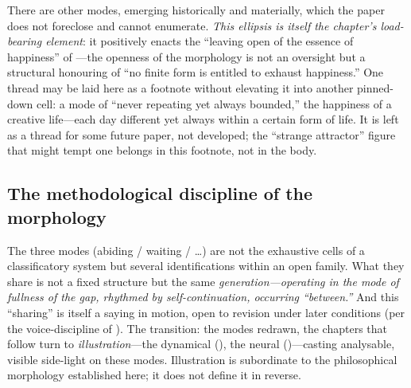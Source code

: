 There are other modes, emerging historically and materially, which the paper does not foreclose and cannot enumerate. \emph{This ellipsis is itself the chapter's load-bearing element}: it positively enacts the ``leaving open of the essence of happiness'' of ---the openness of the morphology is not an oversight but a structural honouring of ``no finite form is entitled to exhaust happiness.'' One thread may be laid here as a footnote without elevating it into another pinned-down cell: a mode of ``never repeating yet always bounded,'' the happiness of a creative life---each day different yet always within a certain form of life. It is left as a thread for some future paper, not developed; the ``strange attractor'' figure that might tempt one belongs in this footnote, not in the body.

\subsection{The methodological discipline of the morphology}
\label{p19:sub:modes-discipline}

The three modes (abiding / waiting / \ldots) are not the exhaustive cells of a classificatory system but several identifications within an open family. What they share is not a fixed structure but the same \emph{generation---operating in the mode of fullness of the gap, rhythmed by self-continuation, occurring ``between.''} And this ``sharing'' is itself a saying in motion, open to revision under later conditions (per the voice-discipline of ). The transition: the modes redrawn, the chapters that follow turn to \emph{illustration}---the dynamical (), the neural ()---casting analysable, visible side-light on these modes. Illustration is subordinate to the philosophical morphology established here; it does not define it in reverse.
